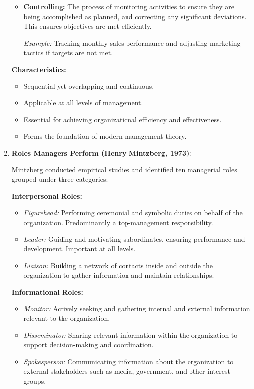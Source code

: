 \documentclass[10pt,a4paper]{book}
\begin{document}
\begin{enumerate}
\begin{itemize}
        \item \textbf{Controlling:}
        The process of monitoring activities to ensure they are being accomplished as planned, and correcting any significant deviations. This ensures objectives are met efficiently.

        \textit{Example:} Tracking monthly sales performance and adjusting marketing tactics if targets are not met.
    \end{itemize}

    \textbf{Characteristics:}
    \begin{itemize}
        \item Sequential yet overlapping and continuous.
        \item Applicable at all levels of management.
        \item Essential for achieving organizational efficiency and effectiveness.
        \item Forms the foundation of modern management theory.
    \end{itemize}

    \item \textbf{Roles Managers Perform (Henry Mintzberg, 1973):}

    Mintzberg conducted empirical studies and identified ten managerial roles grouped under three categories:

    \textbf{Interpersonal Roles:}
    \begin{itemize}
        \item \textit{Figurehead:} Performing ceremonial and symbolic duties on behalf of the organization. Predominantly a top-management responsibility.
        \item \textit{Leader:} Guiding and motivating subordinates, ensuring performance and development. Important at all levels.
        \item \textit{Liaison:} Building a network of contacts inside and outside the organization to gather information and maintain relationships.
    \end{itemize}

    \textbf{Informational Roles:}
    \begin{itemize}
        \item \textit{Monitor:} Actively seeking and gathering internal and external information relevant to the organization.
        \item \textit{Disseminator:} Sharing relevant information within the organization to support decision-making and coordination.
        \item \textit{Spokesperson:} Communicating information about the organization to external stakeholders such as media, government, and other interest groups.
    \end{itemize}


\end{enumerate}
\end{document}
